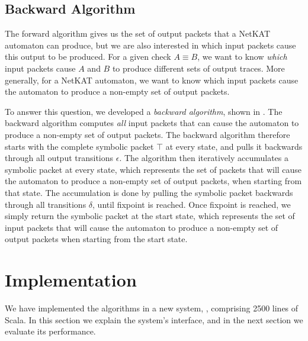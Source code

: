 \documentclass[acmsmall,dvipsnames,nonacm]{acmart}
\begin{document}
\subsection{Backward Algorithm}

The forward algorithm gives us the set of output packets that a NetKAT
automaton can produce, but we are also interested in which input
packets cause this output to be produced.  For a given check $A \equiv
B$, we want to know \emph{which} input packets cause $A$ and $B$ to
produce different sets of output traces.  More generally, for a NetKAT
automaton, we want to know which input packets cause the automaton to
produce a non-empty set of output packets.

To answer this question, we developed a \emph{backward algorithm},
shown in .  The backward algorithm computes
\emph{all} input packets that can cause the automaton to produce a
non-empty set of output packets.  The backward algorithm therefore
starts with the complete symbolic packet $\top$ at every state, and
pulls it backwards through all output transitions $\epsilon$.  The
algorithm then iteratively accumulates a symbolic packet at every
state, which represents the set of packets that will cause the
automaton to produce a non-empty set of output packets, when starting
from that state.  The accumulation is done by pulling the symbolic
packet backwards through all transitions $\delta$, until fixpoint is
reached.  Once fixpoint is reached, we simply return the symbolic
packet at the start state, which represents the set of input packets
that will cause the automaton to produce a non-empty set of output
packets when starting from the start state.

\section{Implementation}\label{sec:impl}

We have implemented the algorithms in a new system, \KATch{}, comprising
2500 lines of Scala. In this section we explain the system's interface, and in the next section we evaluate its performance.%
\end{document}

